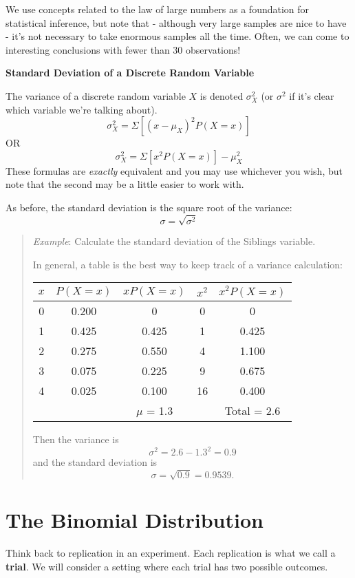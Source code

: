\documentclass[
]{book}
\begin{document}
We use concepts related to the law of large numbers as a foundation for statistical inference, but note that - although very large samples are nice to have - it's not necessary to take enormous samples all the time. Often, we can come to interesting conclusions with fewer than 30 observations!

\textbf{Standard Deviation of a Discrete Random Variable}

The variance of a discrete random variable \(X\) is denoted \(\sigma_X^2\) (or \(\sigma^2\) if it's clear which variable we're talking about).
\[ \sigma_X^2 = \Sigma[(x-\mu_X)^2P(X=x)]\]
OR
\[ \sigma_X^2 = \Sigma[x^2P(X=x)]-\mu_X^2\]
These formulas are \emph{exactly} equivalent and you may use whichever you wish, but note that the second may be a little easier to work with.

As before, the standard deviation is the square root of the variance: \[\sigma = \sqrt{\sigma^2}\]

\begin{quote}
\emph{Example}: Calculate the standard deviation of the Siblings variable.

In general, a table is the best way to keep track of a variance calculation:

\begin{longtable}[]{@{}ccccc@{}}
\toprule
\(x\) & \(P(X=x)\) & \(xP(X=x)\) & \(x^2\) & \(x^2P(X=x)\) \\
\midrule
\endhead
0 & 0.200 & 0 & 0 & 0 \\
1 & 0.425 & 0.425 & 1 & 0.425 \\
2 & 0.275 & 0.550 & 4 & 1.100 \\
3 & 0.075 & 0.225 & 9 & 0.675 \\
4 & 0.025 & 0.100 & 16 & 0.400 \\
& & \(\mu\) = 1.3 & & Total = 2.6 \\
\bottomrule
\end{longtable}

Then the variance is \[\sigma^2 = 2.6 - 1.3^2 = 0.9\] and the standard deviation is \[\sigma = \sqrt{0.9} = 0.9539.\]
\end{quote}

\hypertarget{the-binomial-distribution}{%
\section{The Binomial Distribution}\label{the-binomial-distribution}}

Think back to replication in an experiment. Each replication is what we call a \textbf{trial}. We will consider a setting where each trial has two possible outcomes.
\end{document}
